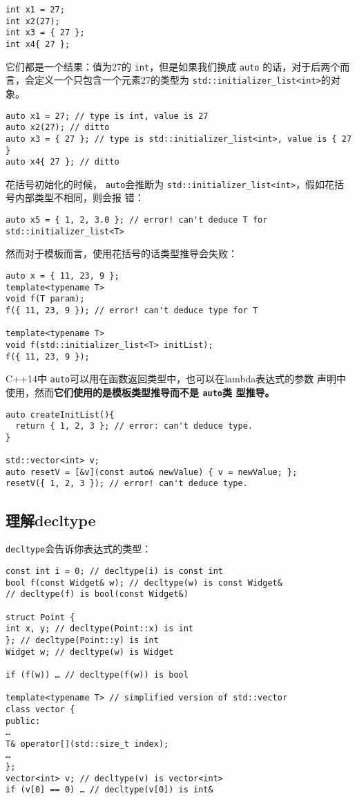 \message{ !name(../CppLearning.tex)}\documentclass[a4paper,twoside]{article}
\theoremstyle{definition}
\theoremstyle{remark}
\numberwithin{equation}{section}
\let\OldTexttt\texttt
\renewcommand{\texttt}[1]{{\color{blue} \OldTexttt{#1}}}
\begin{document}
\begin{verbatim}
int x1 = 27;
int x2(27);
int x3 = { 27 };
int x4{ 27 };
\end{verbatim}
它们都是一个结果：值为27的\texttt{int}，但是如果我们换成\texttt{auto}
的话，对于后两个而言，会定义一个只包含一个元素27的类型为
\texttt{std::initializer\_list<int>}的对象。
\begin{verbatim}
auto x1 = 27; // type is int, value is 27
auto x2(27); // ditto
auto x3 = { 27 }; // type is std::initializer_list<int>, value is { 27 }
auto x4{ 27 }; // ditto
\end{verbatim}

花括号初始化的时候，\texttt{auto}会推断为
\texttt{std::initializer\_list<int>}，假如花括号内部类型不相同，则会报
错：
\begin{verbatim}
auto x5 = { 1, 2, 3.0 }; // error! can't deduce T for std::initializer_list<T>
\end{verbatim}

然而对于模板而言，使用花括号的话类型推导会失败：
\begin{verbatim}
auto x = { 11, 23, 9 };
template<typename T> 
void f(T param);
f({ 11, 23, 9 }); // error! can't deduce type for T

template<typename T>
void f(std::initializer_list<T> initList);
f({ 11, 23, 9 });
\end{verbatim}

C++14中\texttt{auto}可以用在函数返回类型中，也可以在lambda表达式的参数
声明中使用，然而\textbf{它们使用的是模板类型推导而不是\texttt{auto}类
  型推导。}

\begin{verbatim}
auto createInitList(){
  return { 1, 2, 3 }; // error: can't deduce type.
}

std::vector<int> v;
auto resetV = [&v](const auto& newValue) { v = newValue; }; 
resetV({ 1, 2, 3 }); // error! can't deduce type.
\end{verbatim}


\subsection{理解decltype}
\label{sec:Item2-3}

\texttt{decltype}会告诉你表达式的类型：
\begin{verbatim}
const int i = 0; // decltype(i) is const int
bool f(const Widget& w); // decltype(w) is const Widget&
// decltype(f) is bool(const Widget&)

struct Point {
int x, y; // decltype(Point::x) is int
}; // decltype(Point::y) is int
Widget w; // decltype(w) is Widget

if (f(w)) … // decltype(f(w)) is bool

template<typename T> // simplified version of std::vector
class vector {
public:
…
T& operator[](std::size_t index);
…
};
vector<int> v; // decltype(v) is vector<int>
if (v[0] == 0) … // decltype(v[0]) is int&
\end{verbatim}
\end{document}
